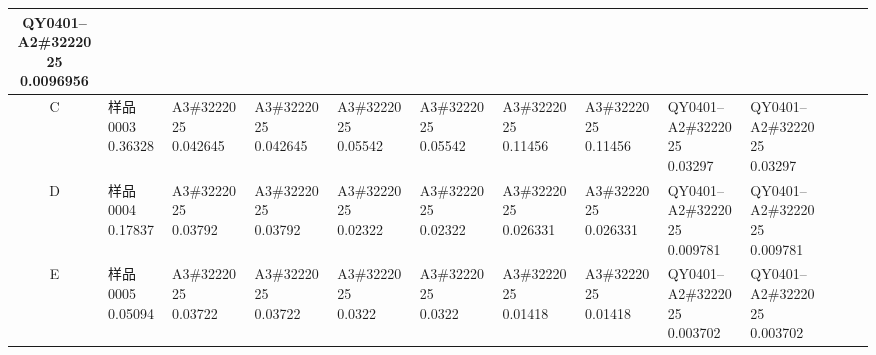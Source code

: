 \documentclass[UTF8,10pt,a4paper,fontset=fandol]{ctexart}
\begin{document}
\begin{center}
\begin{tabular}{c|*{12}{p{0.55cm}|}}
\shortstack{QY0401--\\A2\#3222025\\0.0096956} &
\\ \hline
C &
\shortstack{样品0003\\0.36328} &
\shortstack{A3\#3222025\\0.042645} &
\shortstack{A3\#3222025\\0.042645} &
\shortstack{A3\#3222025\\0.05542} &
\shortstack{A3\#3222025\\0.05542} &
\shortstack{A3\#3222025\\0.11456} &
\shortstack{A3\#3222025\\0.11456} &
\shortstack{QY0401--\\A2\#3222025\\0.03297} &
\shortstack{QY0401--\\A2\#3222025\\0.03297} &
 &
 &
\\ \hline
D &
\shortstack{样品0004\\0.17837} &
\shortstack{A3\#3222025\\0.03792} &
\shortstack{A3\#3222025\\0.03792} &
\shortstack{A3\#3222025\\0.02322} &
\shortstack{A3\#3222025\\0.02322} &
\shortstack{A3\#3222025\\0.026331} &
\shortstack{A3\#3222025\\0.026331} &
\shortstack{QY0401--\\A2\#3222025\\0.009781} &
\shortstack{QY0401--\\A2\#3222025\\0.009781} &
 &
 &
\\ \hline
E &
\shortstack{样品0005\\0.05094} &
\shortstack{A3\#3222025\\0.03722} &
\shortstack{A3\#3222025\\0.03722} &
\shortstack{A3\#3222025\\0.0322} &
\shortstack{A3\#3222025\\0.0322} &
\shortstack{A3\#3222025\\0.01418} &
\shortstack{A3\#3222025\\0.01418} &
\shortstack{QY0401--\\A2\#3222025\\0.003702} &
\shortstack{QY0401--\\A2\#3222025\\0.003702} &

\end{tabular}
\end{center}
\end{document}
